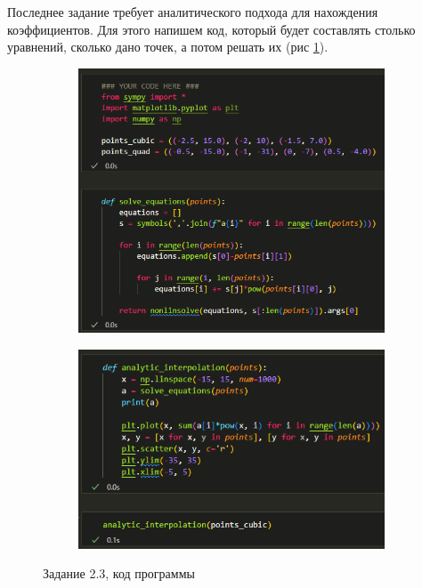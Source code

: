 \documentclass[14pt,a4paper]{extarticle}
\begin{document}
        Последнее задание требует аналитического подхода для нахождения
коэффициентов. Для этого напишем код, который будет составлять столько
уравнений, сколько дано точек, а потом решать их (рис \ref{fig:2.3-code}).

\begin{figure}[h!]
    \begin{subfigure}{.5\textwidth}
        \centering
        \includegraphics[width=0.9\linewidth]{figures//inftech//prac2/2.3-code1.png}
    \end{subfigure}%
    \begin{subfigure}{.5\textwidth}
        \centering
        \includegraphics[width=0.9\linewidth]{figures//inftech//prac2/2.3-code2.png}
    \end{subfigure}

    \caption{Задание 2.3, код программы}
    \label{fig:2.3-code}
\end{figure}
\end{document}
